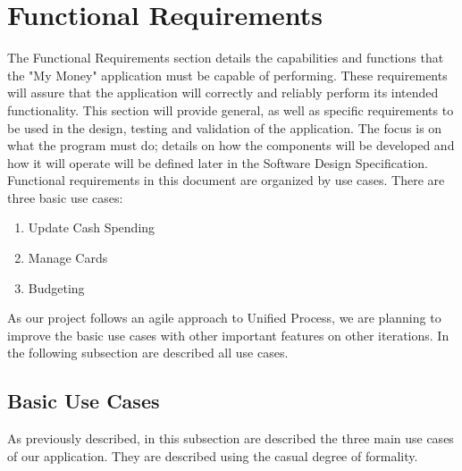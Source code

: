 \documentclass[12pt]{article}
\begin{document}
\section{Functional Requirements}
The Functional Requirements section details the capabilities and functions that the "My Money" application must be capable of performing. These requirements will assure that the application will correctly and reliably perform its intended functionality. This section will provide general, as well as specific requirements to be used in the design, testing and validation of the application. The focus is on what the program must do; details on how the components will be developed and how it will operate will be defined later in the Software Design Specification.
Functional requirements in this document are organized by use cases. There are three basic use cases:
\begin{enumerate}
  \item Update Cash Spending
  \item Manage Cards
  \item Budgeting
\end{enumerate}
As our project follows an agile approach to Unified Process, we are planning to improve the basic use cases with other important features on other iterations.
In the following subsection are described all use cases.

\subsection{Basic Use Cases}

As previously described, in this subsection are described the three main use cases of our application. They are described using the casual degree of formality.
\end{document}
